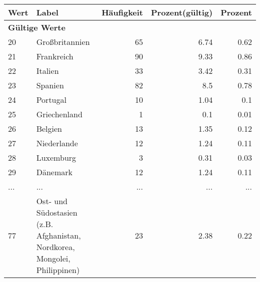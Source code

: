      \begin{longtable}{lXrrr}
     \toprule
     \textbf{Wert} & \textbf{Label} & \textbf{Häufigkeit} & \textbf{Prozent(gültig)} & \textbf{Prozent} \\
     \endhead
     \midrule
     \multicolumn{5}{l}{\textbf{Gültige Werte}}\\
        20 & \multicolumn{1}{X}{Großbritannien} & %
          \num{65} &
          \num[round-mode=places,round-precision=2]{6.74} &
          \num[round-mode=places,round-precision=2]{0.62} \\
        21 & \multicolumn{1}{X}{Frankreich} & %
          \num{90} &
          \num[round-mode=places,round-precision=2]{9.33} &
          \num[round-mode=places,round-precision=2]{0.86} \\
        22 & \multicolumn{1}{X}{Italien} & %
          \num{33} &
          \num[round-mode=places,round-precision=2]{3.42} &
          \num[round-mode=places,round-precision=2]{0.31} \\
        23 & \multicolumn{1}{X}{Spanien} & %
          \num{82} &
          \num[round-mode=places,round-precision=2]{8.5} &
          \num[round-mode=places,round-precision=2]{0.78} \\
        24 & \multicolumn{1}{X}{Portugal} & %
          \num{10} &
          \num[round-mode=places,round-precision=2]{1.04} &
          \num[round-mode=places,round-precision=2]{0.1} \\
        25 & \multicolumn{1}{X}{Griechenland} & %
          \num{1} &
          \num[round-mode=places,round-precision=2]{0.1} &
          \num[round-mode=places,round-precision=2]{0.01} \\
        26 & \multicolumn{1}{X}{Belgien} & %
          \num{13} &
          \num[round-mode=places,round-precision=2]{1.35} &
          \num[round-mode=places,round-precision=2]{0.12} \\
        27 & \multicolumn{1}{X}{Niederlande} & %
          \num{12} &
          \num[round-mode=places,round-precision=2]{1.24} &
          \num[round-mode=places,round-precision=2]{0.11} \\
        28 & \multicolumn{1}{X}{Luxemburg} & %
          \num{3} &
          \num[round-mode=places,round-precision=2]{0.31} &
          \num[round-mode=places,round-precision=2]{0.03} \\
        29 & \multicolumn{1}{X}{Dänemark} & %
          \num{12} &
          \num[round-mode=places,round-precision=2]{1.24} &
          \num[round-mode=places,round-precision=2]{0.11} \\
       ... & ... & ... & ... & ... \\
        77 & \multicolumn{1}{X}{Ost- und Südostasien (z.B. Afghanistan, Nordkorea, Mongolei, Philippinen)} & %
          \num{23} &
          \num[round-mode=places,round-precision=2]{2.38} &
          \num[round-mode=places,round-precision=2]{0.22} \\


\end{longtable}
